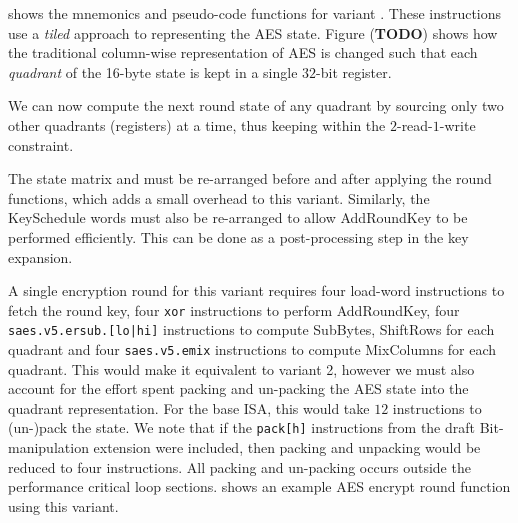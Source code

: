 
 shows the mnemonics and pseudo-code functions
for variant .
These instructions use a {\em tiled} approach to representing the
AES state.
Figure ({\bf TODO}) shows how the traditional column-wise representation
of AES is changed such that each {\em quadrant} of the 16-byte state
is kept in a single $32$-bit register.

We can now compute the next round state of any quadrant by sourcing
only two other quadrants (registers) at a time, thus keeping within
the $2$-read-$1$-write constraint.

The state matrix and must be re-arranged before and after applying
the round functions, which adds a small overhead to this variant.
Similarly, the KeySchedule words must also be re-arranged to allow
AddRoundKey to be performed efficiently.
This can be done as a post-processing step in the key expansion.

A single encryption round for this variant requires
four load-word instructions to fetch the round key,
four {\tt xor} instructions to perform AddRoundKey,
four {\tt saes.v5.ersub.[lo|hi]} instructions to compute
    SubBytes, ShiftRows for each quadrant
and
four {\tt saes.v5.emix} instructions to compute MixColumns for each
quadrant.
This would make it equivalent to variant 2, however we must also
account for the effort spent packing and un-packing the AES
state into the quadrant representation.
For the base ISA, this would take $12$ instructions to (un-)pack the state.
We note that if the {\tt pack[h]} instructions from the draft
Bit-manipulation extension were included, then packing and unpacking
would be reduced to four instructions.
All packing and un-packing occurs outside the performance critical
loop sections.
 shows an example AES encrypt round function
using this variant.


